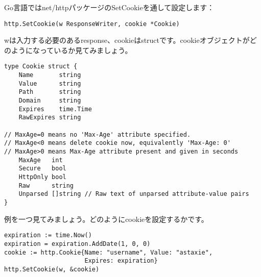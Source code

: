 Go言語ではnet/httpパッケージのSetCookieを通して設定します：


\begin{lstlisting}[numbers=none]
http.SetCookie(w ResponseWriter, cookie *Cookie)
\end{lstlisting}

wは入力する必要のあるresponse、cookieはstructです。cookieオブジェクトがどのようになっているか見てみましょう。

\begin{lstlisting}[numbers=none]
type Cookie struct {
    Name       string
    Value      string
    Path       string
    Domain     string
    Expires    time.Time
    RawExpires string

// MaxAge=0 means no 'Max-Age' attribute specified.
// MaxAge<0 means delete cookie now, equivalently 'Max-Age: 0'
// MaxAge>0 means Max-Age attribute present and given in seconds
    MaxAge   int
    Secure   bool
    HttpOnly bool
    Raw      string
    Unparsed []string // Raw text of unparsed attribute-value pairs
}
\end{lstlisting}

例を一つ見てみましょう。どのようにcookieを設定するかです。

\begin{lstlisting}[numbers=none]
expiration := time.Now()
expiration = expiration.AddDate(1, 0, 0)
cookie := http.Cookie{Name: "username", Value: "astaxie",
                      Expires: expiration}
http.SetCookie(w, &cookie)
\end{lstlisting}


